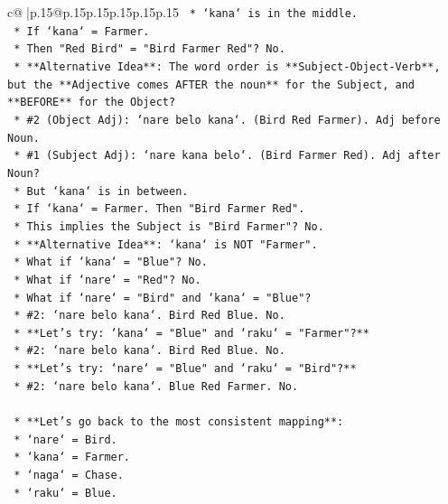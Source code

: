 \documentclass{article}
\begin{document}
{\begin{supertabular}{c@{$\;$}|p{.15\linewidth}@{}p{.15\linewidth}p{.15\linewidth}p{.15\linewidth}p{.15\linewidth}p{.15\linewidth}}
{{{\texttt{                    *   `kana` is in the middle.} \\
\texttt{                    *   If `kana` = Farmer.} \\
\texttt{                    *   Then "Red Bird" = "Bird Farmer Red"? No.} \\
\texttt{            *   **Alternative Idea**: The word order is **Subject{-}Object{-}Verb**, but the **Adjective comes AFTER the noun** for the Subject, and **BEFORE** for the Object?} \\
\texttt{                *   \#2 (Object Adj): `nare belo kana`. (Bird Red Farmer). Adj before Noun.} \\
\texttt{                *   \#1 (Subject Adj): `nare kana belo`. (Bird Farmer Red). Adj after Noun?} \\
\texttt{                    *   But `kana` is in between.} \\
\texttt{                    *   If `kana` = Farmer. Then "Bird Farmer Red".} \\
\texttt{                    *   This implies the Subject is "Bird Farmer"? No.} \\
\texttt{            *   **Alternative Idea**: `kana` is NOT "Farmer".} \\
\texttt{                *   What if `kana` = "Blue"? No.} \\
\texttt{                *   What if `nare` = "Red"? No.} \\
\texttt{                *   What if `nare` = "Bird" and `kana` = "Blue"?} \\
\texttt{                    *   \#2: `nare belo kana`. Bird Red Blue. No.} \\
\texttt{            *   **Let's try: `kana` = "Blue" and `raku` = "Farmer"?**} \\
\texttt{                *   \#2: `nare belo kana`. Bird Red Blue. No.} \\
\texttt{            *   **Let's try: `nare` = "Blue" and `raku` = "Bird"?**} \\
\texttt{                *   \#2: `nare belo kana`. Blue Red Farmer. No.} \\
\\ 
\texttt{    *   **Let's go back to the most consistent mapping**:} \\
\texttt{        *   `nare` = Bird.} \\
\texttt{        *   `kana` = Farmer.} \\
\texttt{        *   `naga` = Chase.} \\
\texttt{        *   `raku` = Blue.} \\
}}}
\end{supertabular}}
\end{document}
